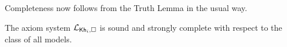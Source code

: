Completeness now follows from the Truth Lemma in the usual way. 

\medskip

\begin{theorem}\label{th:cm-ults-khikt-completeness}
The axiom system $\mathcal{L}_{{\sf Kh}_i,\square}$ is sound and strongly complete with respect to the class of all models.
\end{theorem}
\medskip